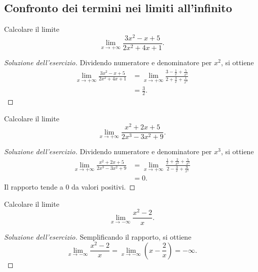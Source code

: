 \subsection{Confronto dei termini nei limiti all'infinito}
\label{sec:esercizi-limiti-limiti-all-infinito}

\begin{exercise}
\label{ex:limiti-foglio-2311-01}
Calcolare il limite
\[
  \lim_{x\to+\infty}\frac{3x^2-x+5}{2x^2+4x+1}.
\]
\end{exercise}
\begin{proof}[Soluzione dell'esercizio]
Dividendo numeratore e denominatore per $x^2$, si ottiene
\[
\begin{aligned}
  \lim_{x\to+\infty}\frac{3x^2-x+5}{2x^2+4x+1}
    &=\lim_{x\to+\infty}
      \frac{3-\frac1x+\frac5{x^2}}{2+\frac4x+\frac1{x^2}}\\
    &=\frac32.
\end{aligned}
\]
\end{proof}

\begin{exercise}
\label{ex:limiti-foglio-2311-02}
Calcolare il limite
\[
  \lim_{x\to+\infty}\frac{x^2+2x+5}{2x^3-3x^2+9}.
\]
\end{exercise}
\begin{proof}[Soluzione dell'esercizio]
Dividendo numeratore e denominatore per $x^3$, si ottiene
\[
\begin{aligned}
  \lim_{x\to+\infty}\frac{x^2+2x+5}{2x^3-3x^2+9}
    &=\lim_{x\to+\infty}
      \frac{\frac1x+\frac2{x^2}+\frac5{x^3}}{2-\frac3x+\frac9{x^3}}\\
    &=0.
\end{aligned}
\]
Il rapporto tende a $0$ da valori positivi.
\end{proof}

\begin{exercise}
\label{ex:limiti-foglio-2311-03}
Calcolare il limite
\[
  \lim_{x\to-\infty}\frac{x^2-2}{x}.
\]
\end{exercise}
\begin{proof}[Soluzione dell'esercizio]
Semplificando il rapporto, si ottiene
\[
  \lim_{x\to-\infty}\frac{x^2-2}{x}
  =\lim_{x\to-\infty}\left(x-\frac2x\right)
  =-\infty.
\]
\end{proof}

